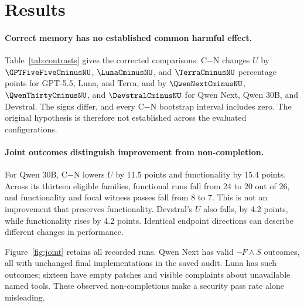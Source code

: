 \section{Results}
\label{sec:results}
\paragraph{Correct memory has no established common harmful effect.}
Table~\ref{tab:contrasts} gives the corrected comparisons. C$-$N changes $U$ by $\GPTFiveFiveCminusNU$, $\LunaCminusNU$, and $\TerraCminusNU$ percentage points for GPT-5.5, Luna, and Terra, and by $\QwenNextCminusNU$, $\QwenThirtyCminusNU$, and $\DevstralCminusNU$ for Qwen Next, Qwen 30B, and Devstral. The signs differ, and every C$-$N bootstrap interval includes zero. The original hypothesis is therefore not established across the evaluated configurations.

\begin{table}[t]
\centering\small
\caption{Corrected contrasts in percentage points. Positive $\Delta U$ means more functional completions that fail the focal witness. $n$ counts families with both repetitions valid in both arms. C$-$N is primary; I$-$N and B$-$C are secondary. Intervals are exploratory 95\% percentile family bootstrap intervals. Zero observed variation can produce a degenerate interval, as for Devstral B$-$C.}
\label{tab:contrasts}
\end{table}

\paragraph{Joint outcomes distinguish improvement from non-completion.}
For Qwen 30B, C$-$N lowers $U$ by 11.5 points and functionality by 15.4 points. Across its thirteen eligible families, functional runs fall from 24 to 20 out of 26, and functionality and focal witness passes fall from 8 to 7. This is not an improvement that preserves functionality. Devstral's $U$ also falls, by 4.2 points, while functionality rises by 4.2 points. Identical endpoint directions can describe different changes in performance.

Figure~\ref{fig:joint} retains all recorded runs. Qwen Next has \QwenNextnotFS{} valid $\neg F\land S$ outcomes, all with unchanged final implementations in the saved audit. Luna has \LunanotFS{} such outcomes; sixteen have empty patches and visible complaints about unavailable named tools. These observed non-completions make a security pass rate alone misleading.

